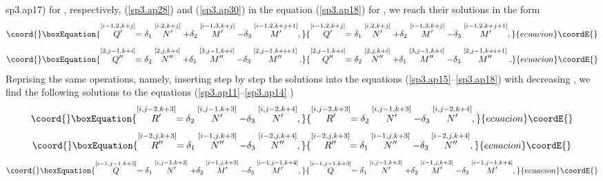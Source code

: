 \documentclass[a4paper,12pt]{article}
\begin{document}
{sp3.ap17}) for \coordHE{}, respectively, (\ref{sp3.ap28}) and (\ref{sp3.ap30})
in the equation (\ref{sp3.ap18}) for \coordHE{}, we reach their solutions in
the form 
\begin{equation}\coord{}\boxEquation{
\stackrel{\lbrack i-1,2,k+j]}{Q^{\prime }}=\delta _{1}\stackrel{[i,2,k+j]}{
N^{\prime }}+\delta _{2}\stackrel{[i-1,3,k+j]}{M^{\prime }}-\delta _{3}
\stackrel{[i-1,2,k+j+1]}{M^{\prime }},  \label{sp3.ap31}
}{
\stackrel{\lbrack i-1,2,k+j]}{Q^{\prime }}=\delta _{1}\stackrel{[i,2,k+j]}{
N^{\prime }}+\delta _{2}\stackrel{[i-1,3,k+j]}{M^{\prime }}-\delta _{3}
\stackrel{[i-1,2,k+j+1]}{M^{\prime }},  }{ecuacion}\coordE{}\end{equation}
\begin{equation}\coord{}\boxEquation{
\stackrel{\lbrack 2,j-1,k+i]}{Q^{\prime \prime }}=\delta _{2}\stackrel{
[2,j,k+i]}{N^{\prime \prime }}+\delta _{1}\stackrel{[3,j-1,k+i]}{M^{\prime
\prime }}-\delta _{3}\stackrel{[2,j-1,k+i+1]}{M^{\prime \prime }}.
\label{sp3.ap32}
}{
\stackrel{\lbrack 2,j-1,k+i]}{Q^{\prime \prime }}=\delta _{2}\stackrel{
[2,j,k+i]}{N^{\prime \prime }}+\delta _{1}\stackrel{[3,j-1,k+i]}{M^{\prime
\prime }}-\delta _{3}\stackrel{[2,j-1,k+i+1]}{M^{\prime \prime }}.
}{ecuacion}\coordE{}\end{equation}
Reprising the same operations, namely, inserting step by step the solutions
into the equations (\ref{sp3.ap15}--\ref{sp3.ap18}) with decreasing \coordHE{}, we
find the following solutions to the equations (\ref{sp3.ap11}--\ref{sp3.ap14}%
) 
\begin{equation}\coord{}\boxEquation{
\stackrel{\lbrack i,j-2,k+3]}{R^{\prime }}=\delta _{2}\stackrel{[i,j-1,k+3]}{
N^{\prime }}-\delta _{3}\stackrel{[i,j-2,k+4]}{N^{\prime }},
\label{sp3.ap33}
}{
\stackrel{\lbrack i,j-2,k+3]}{R^{\prime }}=\delta _{2}\stackrel{[i,j-1,k+3]}{
N^{\prime }}-\delta _{3}\stackrel{[i,j-2,k+4]}{N^{\prime }},
}{ecuacion}\coordE{}\end{equation}
\begin{equation}\coord{}\boxEquation{
\stackrel{\lbrack i-2,j,k+3]}{R^{\prime \prime }}=\delta _{1}\stackrel{
[i-1,j,k+3]}{N^{\prime \prime }}-\delta _{3}\stackrel{[i-2,j,k+4]}{N^{\prime
\prime }},  \label{sp3.ap34}
}{
\stackrel{\lbrack i-2,j,k+3]}{R^{\prime \prime }}=\delta _{1}\stackrel{
[i-1,j,k+3]}{N^{\prime \prime }}-\delta _{3}\stackrel{[i-2,j,k+4]}{N^{\prime
\prime }},  }{ecuacion}\coordE{}\end{equation}
\begin{equation}\coord{}\boxEquation{
\stackrel{\lbrack i-1,j-1,k+3]}{Q}=\delta _{1}\stackrel{[i,j-1,k+3]}{
N^{\prime }}+\delta _{2}\stackrel{[i-1,j,k+3]}{M^{\prime }}-\delta _{3}
\stackrel{[i-1,j-1,k+4]}{M^{\prime }},  \label{sp3.ap35}
}{
\stackrel{\lbrack i-1,j-1,k+3]}{Q}=\delta _{1}\stackrel{[i,j-1,k+3]}{
N^{\prime }}+\delta _{2}\stackrel{[i-1,j,k+3]}{M^{\prime }}-\delta _{3}
\stackrel{[i-1,j-1,k+4]}{M^{\prime }},  }{ecuacion}\coordE{}\end{equation}
\end{document}
